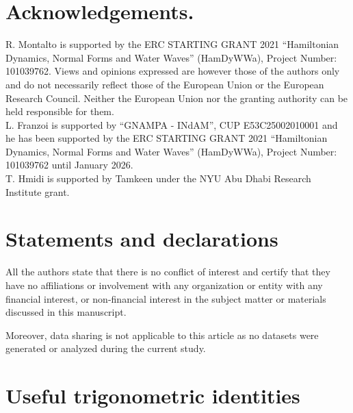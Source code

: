 \documentclass[a4paper,reqno,10pt]{article}
\begin{document}
\section*{ Acknowledgements.}  R. Montalto  
is supported by the ERC STARTING GRANT 2021 ``Hamiltonian Dynamics, 
Normal Forms and Water Waves'' (HamDyWWa), Project Number: 101039762. 
Views and opinions expressed are however those of the authors only and do not necessarily reflect those of the European Union or the European Research Council. Neither the European Union nor the granting authority can be held responsible for them. \\
L. Franzoi is supported by ``GNAMPA - INdAM'', CUP E53C25002010001 and he has been supported by the ERC STARTING GRANT 2021 ``Hamiltonian Dynamics, 
Normal Forms and Water Waves'' (HamDyWWa), Project Number: 101039762 until January 2026. \\ T. Hmidi is supported by Tamkeen under the NYU Abu Dhabi Research Institute grant.  

 \section*{Statements and declarations}

\medskip

\noindent
 All the authors state that there is no conflict of interest and certify that they have no affiliations or involvement with any organization or entity with any
financial interest, or non-financial interest in the subject matter or materials discussed in this manuscript. 

 


Moreover, data sharing is not applicable to this article as no datasets were generated or analyzed during the
current study.



\appendix



\section{Useful trigonometric identities}\label{app.trigo}
\end{document}
